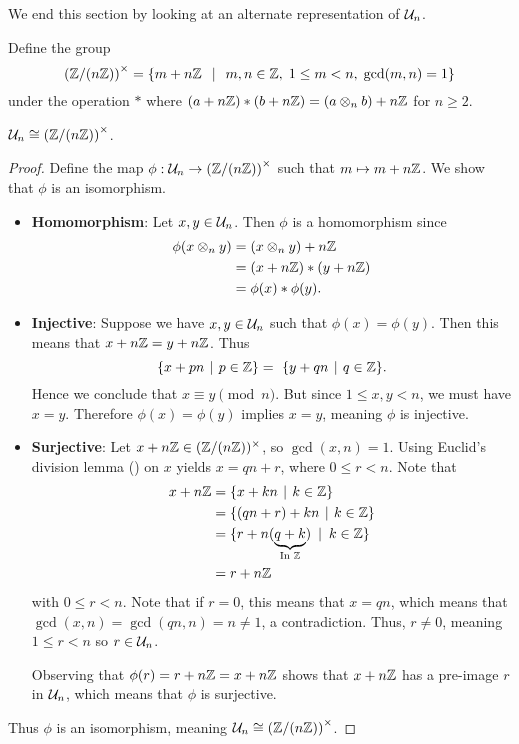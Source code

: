 We end this section by looking at an alternate representation of $\mathcal{U}_{n}$.
\begin{definition}
    Define the group
    \[
        \left(\Z/(n\Z)\right)^{\times} = \left\{m + n\Z \ \vert \ m,n \in \Z,\; 1 \leq m < n,\; \gcd(m, n)=1\right\}
    \]
    under the operation $\ast$ where $(a+n\mathbb{Z})\ast(b+n\mathbb{Z}) = (a\otimes_n b) + n\mathbb{Z}$ for $n \geq 2$.
\end{definition}
\begin{proposition}
    $\mathcal{U}_{n} \cong \left(\mathbb{Z}/(n\mathbb{Z})\right)^{\times}$.
\end{proposition}
\begin{proof}
    Define the map $\phi: \mathcal{U}_{n} \to \left(\mathbb{Z}/(n\mathbb{Z})\right)^{\times}$ such that $m \mapsto m + n\mathbb{Z}$. We show that $\phi$ is an isomorphism.

    \begin{itemize}
        \item \textbf{Homomorphism}: Let $x, y \in \mathcal{U}_{n}$. Then $\phi$ is a homomorphism since
        \begin{align*}
            \phi(x \otimes_n y) &= (x \otimes_n y) + n\mathbb{Z}\\
            &= (x + n\mathbb{Z}) \ast (y + n\mathbb{Z})\\
            &= \phi(x) \ast \phi(y).
        \end{align*}

        \item \textbf{Injective}: Suppose we have $x, y \in \mathcal{U}_{n}$ such that $\phi(x) = \phi(y)$. Then this means that $x + n\mathbb{Z} = y + n\mathbb{Z}$. Thus
        \[
            \{x + pn \vert p \in \Z \} = \ \{y + qn \vert q \in \Z \}.
        \]
        Hence we conclude that $x \equiv y \pmod{n}$. But since $1 \leq x, y < n$, we must have $x = y$. Therefore $\phi(x) = \phi(y)$ implies $x = y$, meaning $\phi$ is injective.

        \item \textbf{Surjective}: Let $x + n\mathbb{Z} \in (\mathbb{Z}/(n\mathbb{Z}))^\times$, so $\gcd(x,n) = 1$. Using Euclid's division lemma () on $x$ yields $x = qn + r$, where $0 \leq r < n$. Note that
        \begin{align*}
            x + n\Z &= \{x + kn \vert k \in \Z\}\\
            &= \{(qn + r) + kn \vert k \in \Z\}\\
            &= \{r + n(\underbrace{q+k}_{\text{In } \Z}) \vertalt k \in \Z\}\\
            &= r + n\Z
        \end{align*}
        with $0 \leq r < n$. Note that if $r = 0$, this means that $x = qn$, which means that $\gcd(x, n) = \gcd(qn, n) = n \neq 1$, a contradiction. Thus, $r \neq 0$, meaning $1 \leq r < n$ so $r \in \mathcal{U}_{n}$.

        Observing that $\phi(r) = r + n\mathbb{Z} = x + n\mathbb{Z}$ shows that $x + n\mathbb{Z}$ has a pre-image $r$ in $\mathcal{U}_{n}$, which means that $\phi$ is surjective.
    \end{itemize}

    Thus $\phi$ is an isomorphism, meaning $\mathcal{U}_{n} \cong \left(\mathbb{Z}/(n\mathbb{Z})\right)^{\times}$.
\end{proof}

